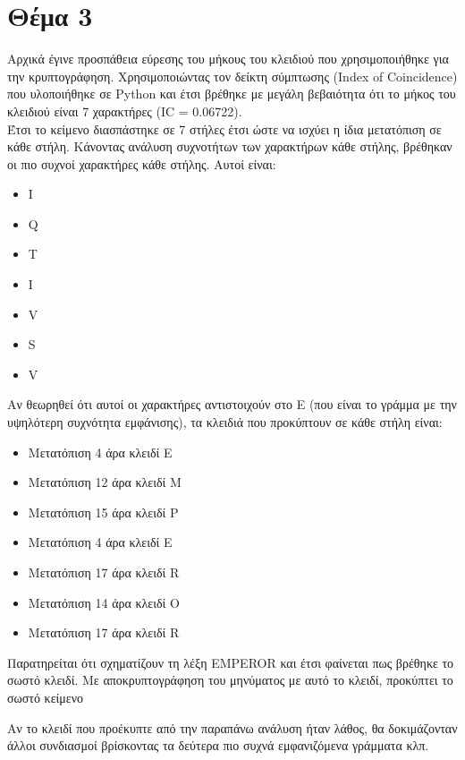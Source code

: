 \documentclass[a4paper, 11pt]{article}
\newcommand{\lt}{\latintext}
\begin{document}
\newpage


\section*{Θέμα 3}
Αρχικά έγινε προσπάθεια εύρεσης του μήκους του κλειδιού που χρησιμοποιήθηκε για την κρυπτογράφηση.
Χρησιμοποιώντας τον δείκτη σύμπτωσης ({\lt Index of Coincidence}) που υλοποιήθηκε σε {\lt Python} και έτσι βρέθηκε
με μεγάλη βεβαιότητα ότι το μήκος του κλειδιού είναι 7 χαρακτήρες ({\lt IC} = 0.06722).
\\
Έτσι το κείμενο διασπάστηκε σε 7 στήλες έτσι ώστε να ισχύει η ίδια μετατόπιση σε κάθε στήλη. Κάνοντας ανάλυση συχνοτήτων
των χαρακτήρων κάθε στήλης, βρέθηκαν οι πιο συχνοί χαρακτήρες κάθε στήλης. Αυτοί είναι:

{\lt
\begin{itemize}
	\item I
	\item Q
	\item T
	\item I
	\item V
	\item S
	\item V
\end{itemize}
}

Αν θεωρηθεί ότι αυτοί οι χαρακτήρες αντιστοιχούν στο {\lt E} (που είναι το γράμμα με την υψηλότερη συχνότητα εμφάνισης), τα
κλειδιά που προκύπτουν σε κάθε στήλη είναι:

\begin{itemize}
	\item Μετατόπιση 4 άρα κλειδί {\lt E}
	\item Μετατόπιση 12 άρα κλειδί {\lt M}
	\item Μετατόπιση 15 άρα κλειδί {\lt P}
	\item Μετατόπιση 4 άρα κλειδί {\lt E}
	\item Μετατόπιση 17 άρα κλειδί {\lt R}
	\item Μετατόπιση 14 άρα κλειδί {\lt O}
	\item Μετατόπιση 17 άρα κλειδί {\lt R}
\end{itemize}

Παρατηρείται ότι σχηματίζουν τη λέξη {\lt EMPEROR} και έτσι φαίνεται πως βρέθηκε το σωστό κλειδί. Με αποκρυπτογράφηση του
μηνύματος με αυτό το κλειδί, προκύπτει το σωστό κείμενο

Αν το κλειδί που προέκυπτε από την παραπάνω ανάλυση ήταν λάθος, θα δοκιμάζονταν άλλοι συνδιασμοί βρίσκοντας τα δεύτερα πιο συχνά εμφανιζόμενα γράμματα κλπ.
\end{document}

